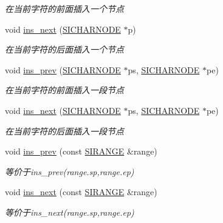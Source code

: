 \begin{DoxyCompactItemize}
\begin{DoxyCompactList}\small\item\em 在当前字符的前面插入一个节点~\newline
\end{DoxyCompactList}\item 
void \hyperlink{class_s_i_c_h_a_r_n_o_d_e_a9a3f1b6c50c483ad2d8a770f4590c50c}{ins\+\_\+next} (\hyperlink{class_s_i_c_h_a_r_n_o_d_e}{S\+I\+C\+H\+A\+R\+N\+O\+DE} $\ast$p)
\begin{DoxyCompactList}\small\item\em 在当前字符的后面插入一个节点~\newline
\end{DoxyCompactList}\item 
void \hyperlink{class_s_i_c_h_a_r_n_o_d_e_ae703c63e9c8e05fc6069e539fc3f6a01}{ins\+\_\+prev} (\hyperlink{class_s_i_c_h_a_r_n_o_d_e}{S\+I\+C\+H\+A\+R\+N\+O\+DE} $\ast$ps, \hyperlink{class_s_i_c_h_a_r_n_o_d_e}{S\+I\+C\+H\+A\+R\+N\+O\+DE} $\ast$pe)
\begin{DoxyCompactList}\small\item\em 在当前字符的前面插入一段节点~\newline
\end{DoxyCompactList}\item 
void \hyperlink{class_s_i_c_h_a_r_n_o_d_e_a5c7b26fb6c8d148b4bb2f81ac21939b9}{ins\+\_\+next} (\hyperlink{class_s_i_c_h_a_r_n_o_d_e}{S\+I\+C\+H\+A\+R\+N\+O\+DE} $\ast$ps, \hyperlink{class_s_i_c_h_a_r_n_o_d_e}{S\+I\+C\+H\+A\+R\+N\+O\+DE} $\ast$pe)
\begin{DoxyCompactList}\small\item\em 在当前字符的后面插入一段节点~\newline
\end{DoxyCompactList}\item 
void \hyperlink{class_s_i_c_h_a_r_n_o_d_e_a85ebada9a5d765d7f055bab903b6c6d2}{ins\+\_\+prev} (const \hyperlink{struct_s_i_r_a_n_g_e}{S\+I\+R\+A\+N\+GE} \&range)
\begin{DoxyCompactList}\small\item\em 等价于{\ttfamily ins\+\_\+prev(range.\+sp,range.\+ep)}~\newline
\end{DoxyCompactList}\item 
void \hyperlink{class_s_i_c_h_a_r_n_o_d_e_af8048308dc6b0ffdf02caceb814ee8e3}{ins\+\_\+next} (const \hyperlink{struct_s_i_r_a_n_g_e}{S\+I\+R\+A\+N\+GE} \&range)
\begin{DoxyCompactList}\small\item\em 等价于{\ttfamily ins\+\_\+next(range.\+sp,range.\+ep)}~\newline

\end{DoxyCompactList}
\end{DoxyCompactItemize}
